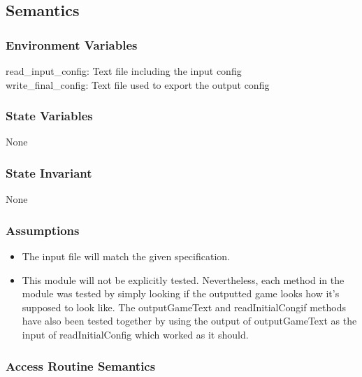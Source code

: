 \documentclass[12pt]{article}
\begin{document}
\subsection* {Semantics}

\subsubsection* {Environment Variables}

read\_input\_config: Text file including the input config\\
write\_final\_config: Text file used to export the output config

\subsubsection* {State Variables}

None

\subsubsection* {State Invariant}

None

\subsubsection* {Assumptions}
\begin{itemize}
\item The input file will match the given specification. 
\item This module will not be explicitly tested. Nevertheless, each method in the module was tested by simply looking if the outputted game looks how it's supposed to look like. The outputGameText and readInitialCongif methods have also been tested together by using the output of outputGameText as the input of readInitialConfig which worked as it should. 
\end{itemize}
\subsubsection* {Access Routine Semantics}
\end{document}
